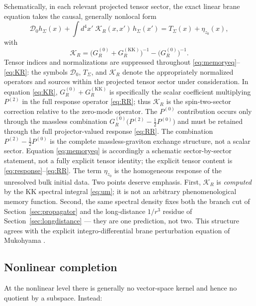 \documentclass[11pt,a4paper]{article}
\theoremstyle{plain}
\theoremstyle{definition}
\newcommand{\KK}{\mathrm{KK}}
\begin{document}
Schematically, in each relevant projected tensor sector, the exact linear
brane equation takes the causal, generally nonlocal form
\begin{equation}
\label{eq:memoryeq}
\mathcal D_0 h_\Sigma(x)
+\int d^4x'\;\mathcal K_R(x,x')\,h_\Sigma(x')
=T_\Sigma(x)+\eta_{z_0}(x),
\end{equation}
with
\begin{equation}
\label{eq:KR}
\mathcal K_R
=\bigl(G_R^{(0)}+G_R^{(\KK)}\bigr)^{-1}
-\bigl(G_R^{(0)}\bigr)^{-1}.
\end{equation}
Tensor indices and normalizations are suppressed throughout
\eqref{eq:memoryeq}--\eqref{eq:KR}: the symbols $\mathcal D_0$,
$T_\Sigma$, and $\mathcal K_R$ denote the appropriately normalized
operators and sources within the projected tensor sector under
consideration. In equation \eqref{eq:KR},
$G_R^{(0)}+G_R^{(\KK)}$ is specifically the scalar coefficient
multiplying $P^{(2)}$ in the full response operator \eqref{eq:RR}; thus
$\mathcal K_R$ is the spin-two-sector correction relative to the
zero-mode operator. The $P^{(0)}$ contribution occurs only through the
massless combination $G_R^{(0)}\bigl(P^{(2)}-\tfrac12P^{(0)}\bigr)$ and
must be retained through the full projector-valued response
\eqref{eq:RR}. The combination $P^{(2)}-\tfrac12P^{(0)}$ is the complete
massless-graviton exchange structure, not a scalar sector. Equation
\eqref{eq:memoryeq} is accordingly a schematic sector-by-sector statement,
not a fully explicit tensor identity; the explicit tensor content is
\eqref{eq:response}--\eqref{eq:RR}. The term $\eta_{z_0}$ is the
homogeneous response of the unresolved bulk initial data. Two points
deserve emphasis. First, $\mathcal K_R$ is
\emph{computed} by the KK spectral integral \eqref{eq:um}; it is not an
arbitrary phenomenological memory function. Second, the same spectral
density fixes both the branch cut of Section~\ref{sec:propagator} and the
long-distance $1/r^3$ residue of Section~\ref{sec:longdistance} --- they
are one prediction, not two. This structure agrees with the explicit
integro-differential brane perturbation equation of Mukohyama
\cite{Mukohyama2}.

\subsection{Nonlinear completion}

At the nonlinear level there is generally no vector-space kernel and
hence no quotient by a subspace. Instead:
\end{document}
